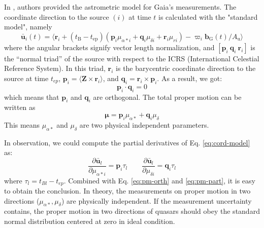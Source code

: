 In \citet{lindegrenAstrometricCoreSolution2012}, authors provided the astrometric model for Gaia's measurements. The coordinate direction to the source $(i)$ at time $t$ is calculated with the "standard model", namely
\begin{equation}
    \bar{\boldsymbol{u}}_i(t) = \langle \boldsymbol{r}_i + (t_{\mathrm{B}} - t_{\mathrm{ep}})(\boldsymbol{p}_i \mu_{\alpha*i} + \boldsymbol{q}_i \mu_{\delta i} + \boldsymbol{r}_i \mu_{r i}) - \varpi_i \boldsymbol{b}_{\mathrm{G}}(t)/A_{\mathrm{u}} \rangle
\label{eq:cord-model}
\end{equation}
where the angular brackets signify vector length normalization, and $[\boldsymbol{p}_i\ \boldsymbol{q}_i\ \boldsymbol{r}_i]$ is the “normal triad” of the source with respect to the ICRS (International Celestial Reference System). In this triad, $\boldsymbol{r}_i$ is the barycentric coordinate direction to the source at time $t_{ep}$, $\boldsymbol{p}_i = \langle \boldsymbol{Z} \times \boldsymbol{r}_i \rangle$, and $\boldsymbol{q}_i = \boldsymbol{r}_i \times \boldsymbol{p}_i$. As a result, we got:
\begin{equation}
    \boldsymbol{p}_i \cdot \boldsymbol{q}_i=0
    \label{eq:pm-orth}
\end{equation}
which means that $\boldsymbol{p}_i$ and $\boldsymbol{q}_i$ are orthogonal. The total proper motion can be written as 
\begin{equation}
   \boldsymbol{\mu} = \boldsymbol{p}_i \mu_{\alpha*} + \boldsymbol{q}_i \mu_{\delta} 
   \label{eq:pm-model}
\end{equation}
This means $\mu_{\alpha*}$ and $\mu_{\delta}$ are two physical independent parameters.

In observation, we could compute the partial derivatives of Eq. \ref{eq:cord-model} as:
\begin{equation}
    \frac{\partial \bar{\boldsymbol{u}}_l}{\partial \mu_{\alpha*i}} = \boldsymbol{p}_i \tau_l \qquad \frac{\partial \bar{\boldsymbol{u}}_l}{\partial \mu_{\delta i}} = \boldsymbol{q}_i \tau_l
    \label{eq:pm-part}
\end{equation}
where $\tau_l = t_{Bl} - t_{ep}$. Combined with Eq. \ref{eq:pm-orth} and \ref{eq:pm-part}, it is easy to obtain the conclusion. In theory, the measurements on proper motion in two directions ($\mu_{\alpha*}, \mu_{\delta}$) are physically independent. If the measurement uncertainty contains, the proper motion in two directions of quasars should obey the standard normal distribution centered at zero in ideal condition.

